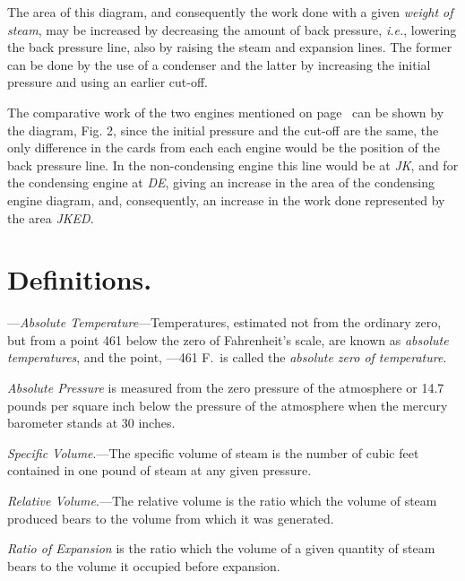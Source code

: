 \documentclass[11pt, a5paper]{book}
\begin{document}
The area of this diagram, and consequently the work done with a given
\textit{weight of steam}, may be increased by decreasing the amount of
back pressure, \textit{i.e.}, lowering the back pressure line, also
by raising the steam and expansion lines.  The former can be done by
the use of a condenser and the latter by increasing the initial
pressure and using an earlier cut-off.\par

The comparative work of the two engines mentioned on
page~\pageref{cond_non-cond} can be shown by the diagram, Fig. 2,
since the initial pressure and the cut-off are the same, the only
difference in the cards from each each engine would be the position of
the back pressure line.  In the non-condensing engine this line would
be at \textit{JK}, and for the condensing engine at \textit{DE},
giving an increase in the area of the condensing engine diagram, and,
consequently, an increase in the work done represented by the area
\textit{JKED}.\par

\section{Definitions.}---\textit{Absolute Temperature}---Temperatures,
estimated not from the ordinary zero, but from a point 461\degree{}
below the zero of Fahrenheit's scale, are known as \textit{absolute
  temperatures}, and the point, ---461\degree{} F.\ is called the
\textit{absolute zero of temperature}.\par

\textit{Absolute Pressure} is measured from the zero pressure of the
atmosphere or 14.7 pounds per square inch below the pressure of the
atmosphere when the mercury barometer stands at 30 inches.\par

\textit{Specific Volume}.---The specific volume of steam is the number
of cubic feet contained in one pound of steam at any given
pressure.\par

\textit{Relative Volume}.---The relative volume is the ratio which the
volume of steam produced bears to the volume from which it was
generated.\par

\textit{Ratio of Expansion} is the ratio which the volume of a given
quantity of steam bears to the volume it occupied before
expansion.\par
\end{document}

